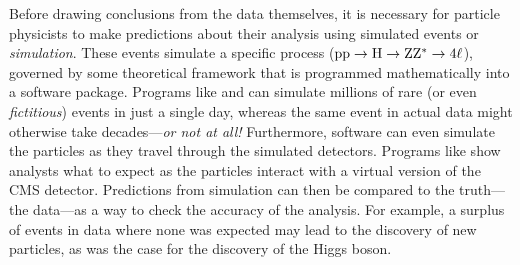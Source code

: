 Before drawing conclusions from the data themselves, it is necessary for particle physicists to make predictions about their analysis using simulated events or \emph{simulation}.
These events simulate a specific process (\eg $\mathrm{p} \mathrm{p} \to \mathrm{H} \to \mathrm{Z}\mathrm{Z}^{\ast} \to 4\ell$), governed by some theoretical framework that is programmed mathematically into a software package.
Programs like \MGvATNLO and \POWHEG can simulate millions of rare (or even \emph{fictitious}) events in just a single day, whereas the same event in actual data might otherwise take decades---\emph{or not at all!}%
Furthermore, software can even simulate the particles as they travel through the simulated detectors.
Programs like \GEANTfour show analysts what to expect as the particles interact with a virtual version of the CMS detector.
Predictions from simulation can then be compared to the truth---the data---as a way to check the accuracy of the analysis.
For example, a surplus of events in data where none was expected may lead to the discovery of new particles, as was the case for the discovery of the Higgs boson.

